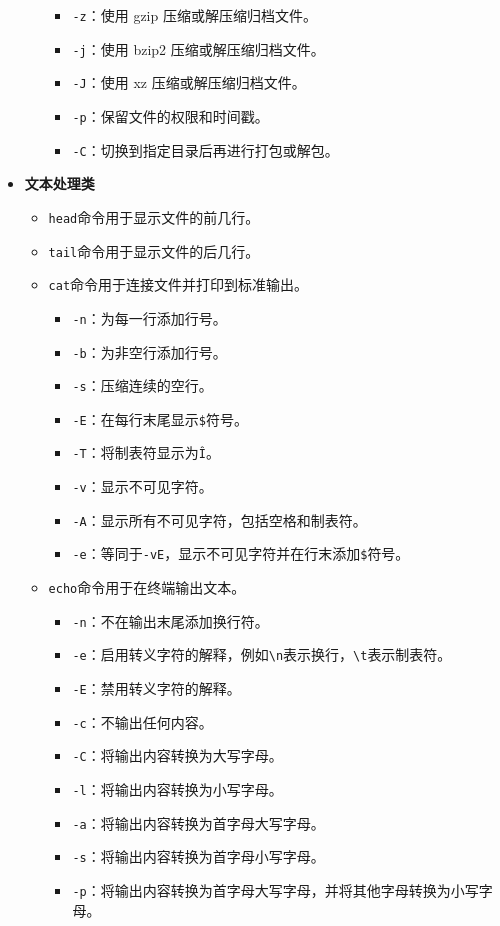 \begin{itemize}
\begin{itemize}
\begin{itemize}
          \item \texttt{-z}：使用 gzip 压缩或解压缩归档文件。
          \item \texttt{-j}：使用 bzip2 压缩或解压缩归档文件。
          \item \texttt{-J}：使用 xz 压缩或解压缩归档文件。
          \item \texttt{-p}：保留文件的权限和时间戳。
          \item \texttt{-C}：切换到指定目录后再进行打包或解包。
        \end{itemize}
    \end{itemize}
  \item \textbf{文本处理类}
    \begin{itemize}
      \item \texttt{head}命令用于显示文件的前几行。
      \item \texttt{tail}命令用于显示文件的后几行。
      \item \texttt{cat}命令用于连接文件并打印到标准输出。
        \begin{itemize}
          \item \texttt{-n}：为每一行添加行号。
          \item \texttt{-b}：为非空行添加行号。
          \item \texttt{-s}：压缩连续的空行。
          \item \texttt{-E}：在每行末尾显示\texttt{\$}符号。
          \item \texttt{-T}：将制表符显示为\texttt{\^I}。
          \item \texttt{-v}：显示不可见字符。
          \item \texttt{-A}：显示所有不可见字符，包括空格和制表符。
          \item \texttt{-e}：等同于\texttt{-vE}，显示不可见字符并在行末添加\texttt{\$}符号。
        \end{itemize}
      \item \texttt{echo}命令用于在终端输出文本。
        \begin{itemize}
          \item \texttt{-n}：不在输出末尾添加换行符。
          \item \texttt{-e}：启用转义字符的解释，例如\texttt{\textbackslash n}表示换行，\texttt{\textbackslash t}表示制表符。
          \item \texttt{-E}：禁用转义字符的解释。
          \item \texttt{-c}：不输出任何内容。
          \item \texttt{-C}：将输出内容转换为大写字母。
          \item \texttt{-l}：将输出内容转换为小写字母。
          \item \texttt{-a}：将输出内容转换为首字母大写字母。
          \item \texttt{-s}：将输出内容转换为首字母小写字母。
          \item \texttt{-p}：将输出内容转换为首字母大写字母，并将其他字母转换为小写字母。
        \end{itemize}
    \end{itemize}
\end{itemize}

